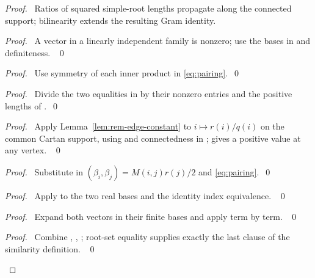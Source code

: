 \begin{proof}
\pfsketch\ Ratios of squared simple-root lengths propagate along the
connected support; bilinearity extends the resulting Gram identity.
\begin{proof}\pf\ A vector in a linearly independent family is nonzero;
use the bases in  and definiteness. ~\qed\end{proof}
\begin{proof}\pf\ Use symmetry of each inner product in \eqref{eq:pairing}.~\qed\end{proof}
\begin{proof}\pf\ Divide the two equalities in 
by their nonzero entries and the positive lengths of .~\qed\end{proof}
\begin{proof}\pf\ Apply
Lemma~\ref{lem:rem-edge-constant} to $i\mapsto r(i)/q(i)$ on the common
Cartan support, using  and connectedness in ;
 gives a positive value at any vertex. ~\qed\end{proof}
\begin{proof}\pf\ Substitute  in
$(\beta_i,\beta_j)=M(i,j)r(j)/2$ and \eqref{eq:pairing}.~\qed\end{proof}
\begin{proof}\pf\ Apply  to the two real
bases and the identity index equivalence. ~\qed\end{proof}
\begin{proof}\pf\ Expand both vectors in their finite bases and apply
 term by term. ~\qed\end{proof}
\qedstep
\begin{proof}\pf\ Combine , ,
; root-set equality supplies exactly the last clause
of the similarity definition. ~\qed\end{proof}
\end{proof}


